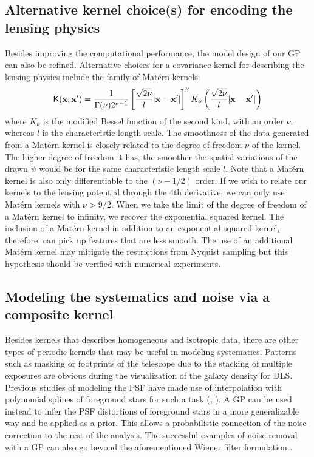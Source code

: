 \subsection{Alternative kernel choice(s) for encoding the lensing physics}
Besides improving the computational performance, the model design of our GP can
also be refined.
Alternative choices for a covariance kernel for describing the lensing physics 
include the family of Mat\'{e}rn kernels:
\begin{equation}
	\mathsf{K}(\mathbf{x}, \mathbf{x}') = \frac{1}{\Gamma(\nu)2^{\nu-1}}\left[
		\frac{\sqrt{2\nu}}{l}|\mathbf{x} - \mathbf{x}'|
	\right]^\nu K_\nu \left(\frac{\sqrt{2\nu}}{l}|\mathbf{x}-\mathbf{x}'|\right) 
\end{equation}
where $K_\nu$ is the modified Bessel function of the second kind, with an order
$\nu$, whereas $l$ is the characteristic length scale.
The smoothness of the data generated from a Mat\'{e}rn kernel is closely
related to the degree of freedom $\nu$ of the kernel. 
The higher degree of freedom it has, the smoother the spatial variations of the
drawn $\psi$ would be for the same characteristic length scale $l$.
Note that a Mat\'{e}rn kernel is also only differentiable to the $(\nu-1/2)$ order.
If we wish to relate our kernels to the lensing potential through the 4th
derivative, we can only use Mat\'{e}rn kernels with $\nu > 9/2$. 
When we take the limit of the degree of freedom of a Mat\'{e}rn kernel to infinity, 
we recover the exponential squared kernel. The inclusion of a Mat\'{e}rn kernel
in addition to an exponential squared kernel, therefore, can pick up features
that are less smooth. The use of an additional Mat\'{e}rn kernel may mitigate the
restrictions from Nyquist sampling but this hypothesis should be verified with
numerical experiments. 

 

\subsection{Modeling the systematics and noise via a composite kernel}
Besides kernels that describes homogeneous and isotropic data,
there are other types of periodic kernels that may be useful
in modeling systematics. 
Patterns such as masking or footprints of the telescope due to the
stacking of multiple exposures are obvious during the visualization of the
galaxy density for DLS. 
Previous studies of modeling the PSF
have made use of interpolation with polynomial splines of foreground stars 
for such a task (\citealt{Rowe2010},
\citealt{Jee2013a}).  A GP can be used instead to infer the PSF distortions
of foreground stars in a more generalizable way and be
applied as a prior. This allows a probabilistic connection of the noise correction to the rest of the
analysis. The successful examples of noise removal with a GP can also go beyond 
the aforementioned Wiener filter formulation \citep{Perez-Cruz2013}.


